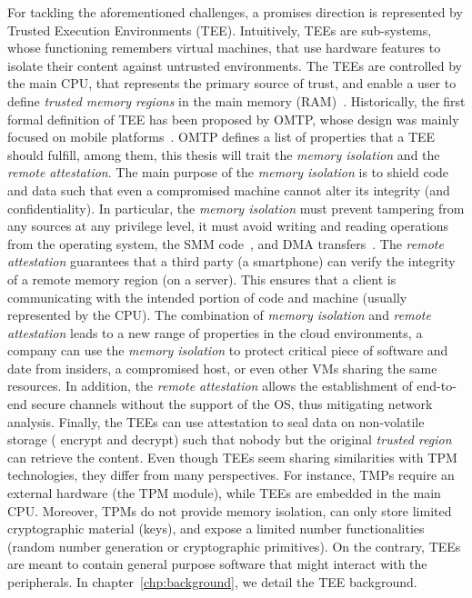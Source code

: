 For tackling the aforementioned challenges, a promises direction is 
represented by Trusted Execution Environments (TEE).
Intuitively, TEEs are sub-systems, whose functioning remembers virtual 
machines, that use hardware features to isolate their content against untrusted 
environments.
The TEEs are controlled by the main CPU, that represents the primary source of 
trust, and enable a user to define \emph{trusted memory regions} in the main 
memory (RAM)~\citep{Sabt2015TrustedEE}.
Historically, the first formal definition of TEE has been proposed by OMTP, 
whose design was mainly focused on mobile platforms~\citep{omtp}.
OMTP defines a list of properties that a TEE should fulfill, among them, this 
thesis will trait the \emph{memory isolation} and the \emph{remote attestation}.
The main purpose of the \emph{memory isolation} is to shield code and data such 
that even a compromised machine cannot alter its integrity (and 
confidentiality).
In particular, the \emph{memory isolation} must prevent tampering from any 
sources at any privilege level, \eg it must avoid writing and reading 
operations from the operating system, the SMM code~\citep{yao2009system}, and 
DMA transfers~\citep{coke1998implementing}.
The \emph{remote attestation} guarantees that a third party (\eg a smartphone) 
can verify the integrity of a remote memory region (\eg on a server).
This ensures that a client is communicating with the intended portion of code 
and machine (usually represented by the CPU).
The combination of \emph{memory isolation} and \emph{remote attestation} leads 
to a new range of properties in the cloud environments, \ie a company 
can use the \emph{memory isolation} to protect critical piece of 
software and date from insiders, a compromised host, or even other VMs sharing 
the same resources.
In addition, the \emph{remote attestation} allows the establishment of 
end-to-end secure channels without the support of the OS, thus mitigating 
network analysis.
Finally, the TEEs can use attestation to seal data on non-volatile storage (\ie 
encrypt and decrypt) such that nobody but the original \emph{trusted region} 
can retrieve the content. 
Even though TEEs seem sharing similarities with TPM technologies, they differ 
from many perspectives.
For instance, TMPs require an external hardware (\ie the TPM module), while 
TEEs are embedded in the main CPU.
Moreover, TPMs do not provide memory isolation, can only store limited 
cryptographic material (\eg keys), and expose a limited number functionalities 
(\eg random number generation or cryptographic primitives).
On the contrary, TEEs are meant to contain general purpose software that might 
interact with the peripherals.
In chapter~\ref{chp:background}, we detail the TEE background.

